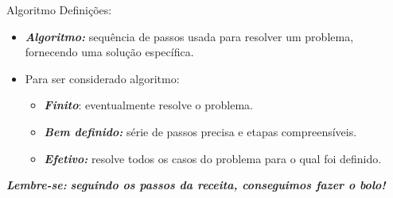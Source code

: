 \documentclass{beamer}
\begin{document}
\begin{frame}{Algoritmo}
	\label{algoritmos_intro}
	Definições:
	
	\begin{itemize}
		\item \textbf{\textit{Algoritmo:}} sequência de passos usada para resolver um problema, fornecendo uma solução específica.
		\item Para ser considerado algoritmo:
		\begin{itemize}
			\item \textbf{\textit{Finito}}: eventualmente resolve o problema. 
			\item \textbf{\textit{Bem definido: }} série de passos precisa e etapas compreensíveis. 
			\item \textbf{\textit{Efetivo: }} resolve todos os casos do problema para o qual foi definido. 
		\end{itemize}
	\end{itemize}
	\alert{\textbf{\textit{Lembre-se:}}} \textbf{\textit{seguindo os passos da receita, conseguimos fazer o bolo!}}
\end{frame}
\end{document}
